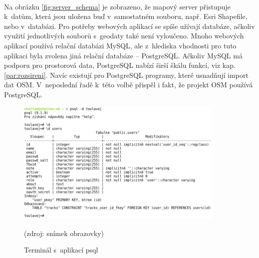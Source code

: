 \documentclass[11pt,a4paper,titlepage,oneside]{book}
\begin{document}
		\paragraph{} Na obrázku \ref{fig:server_schema} je zobrazeno, že mapový server přistupuje k~datům, která jsou uložena buď v~samostatném souboru, např. Esri Shapefile, nebo v~databázi. Pro potřeby webových aplikací se spíše užívají databáze, ačkoliv využití jednotlivých souborů s~geodaty také není vyloučeno. Mnoho webových aplikací používá relační databázi MySQL, ale z~hlediska vhodnosti pro tuto aplikaci byla zvolena jiná relační databáze -- PostgreSQL. Ačkoliv MySQL má podporu pro prostorová data, PostgreSQL nabízí širší škálu funkcí, viz kap. \ref{par:rozsireni}. Navíc existují pro PostgreSQL programy, které usnadňují import dat \ac{OSM}. V~neposlední řadě k~této volbě přispěl i fakt, že projekt \ac{OSM} používá PostgreSQL.
		\begin{figure}[!h]
			\begin{center}
				\includegraphics[width=10cm]{obrazky/psql.png}
				\caption{Terminál s~aplikací psql}
				\label{fig:psql}
				(zdroj: snímek obrazovky)
			\end{center}
		\end{figure}




\end{document}
